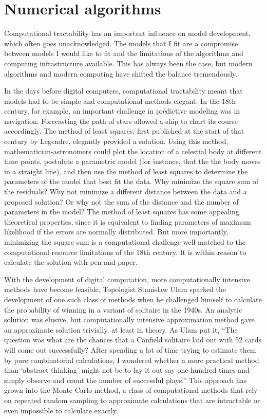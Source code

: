 \chapter{Numerical algorithms}
\label{numerical-algorithms}

Computational tractability has an important influence on model
development, which often goes unacknowledged. The models that I fit
are a compromise between models I would like to fit and the
limitations of the algorithms and computing infrastructure
available. This has always been the case, but modern algorithms and
modern computing have shifted the balance tremendously.

In the days before digital computers, computational tractability meant
that models had to be simple and computational methods elegant. In the
18th century, for example, an important challenge in predictive
modeling was in navigation.\cite{Williams_From_1993} Forecasting the
path of stars allowed a ship to chart its course accordingly. The
method of least squares, first published at the start of that century
by Legendre, elegantly provided a
solution.\cite{Legendre_Nouvelles_2011} Using this method,
mathematician-astronomers could plot the location of a celestial body
at different time points, postulate a parametric model (for instance,
that the the body moves in a straight line), and then use the method
of least squares to determine the parameters of the model that best
fit the data.  Why minimize the square sum of the residuals?  Why not
minimize a different distance between the data and a proposed
solution? Or why not the sum of the distance and the number of
parameters in the model? The method of least squares has some
appealing theoretical properties, since it is equivalent to finding
parameters of maximum likelihood if the errors are normally
distributed. But more importantly, minimizing the square sum is a
computational challenge well matched to the computational resource
limitations of the 18th century.  It is within reason to calculate the
solution with pen and paper.

With the development of digital computation, more computationally
intensive methods have become feasible. Topologist Stanislaw Ulam
sparked the development of one such class of methods when he
challenged himself to calculate the probability of winning in a
variant of solitaire in the 1940s. An analytic solution was elusive,
but computationally intensive approximation method gave an approximate
solution trivially, at least in theory. As Ulam put it, ``The question
was what are the chances that a Canfield solitaire laid out with 52
cards will come out successfully?  After spending a lot of time trying
to estimate them by pure combinatorial calculations, I wondered
whether a more practical method than `abstract thinking' might not be
to lay it out say one hundred times and simply observe and count the
number of successful plays.''  This approach has grown into the Monte
Carlo method, a class of computational methods that rely on repeated
random sampling to approximate calculations that are intractable or
even impossible to calculate exactly.\cite{Eckhardt_Stan_1987}

